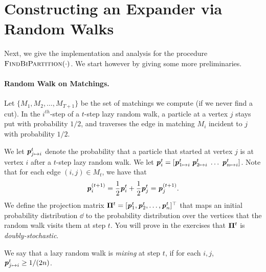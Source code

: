 \section{Constructing an Expander via Random Walks}

Next, we give the implementation and analysis for the procedure $\textsc{FindBiPartition}(\cdot)$. We start however by giving some more preliminaries.

\paragraph{Random Walk on Matchings.} Let $\{M_1, M_2, \dots, M_{T+1}\}$ be the set of matchings we compute (if we never find a cut). In the $i^{th}$-step of a $t$-step lazy random walk, a particle at a vertex $j$ stays put with probability $1/2$, and traverses the edge in matching $M_i$ incident to $j$ with probability $1/2$. 

We let $\boldsymbol{\mathit{p}}_{j \mapsto i}^t$ denote the probability that a particle that started at vertex $j$ is at vertex $i$ after a $t$-step lazy random walk. We let $\boldsymbol{\mathit{p}}_i^t = [\boldsymbol{\mathit{p}}_{1 \mapsto i}^t\; \boldsymbol{\mathit{p}}_{2 \mapsto i}^t\; \dots \;\boldsymbol{\mathit{p}}_{n \mapsto i}^t]$. Note that for each edge $(i,j) \in M_t$, we have that 
\[
\boldsymbol{\mathit{p}}_i^{(t+1)} = \frac{1}{2} \boldsymbol{\mathit{p}}_i^t + \frac{1}{2} \boldsymbol{\mathit{p}}_j^t = \boldsymbol{\mathit{p}}_j^{(t+1)}.
\]
We define the projection matrix $\boldsymbol{\Pi}^t = [\boldsymbol{\mathit{p}}_1^{t}, \boldsymbol{\mathit{p}}_2^{t}, \dots, \boldsymbol{\mathit{p}}_n^{t}]^\top$ that maps an initial probability distribution $\dd$ to the probability distribution over the vertices that the random walk visits them at step $t$. You will prove in the exercises that $\boldsymbol{\Pi}^t$ is \emph{doubly-stochastic}.

We say that a lazy random walk is \emph{mixing} at step $t$, if for each $i,j$, $\boldsymbol{\mathit{p}}_{j \mapsto i}^t \geq 1/(2n)$. 


